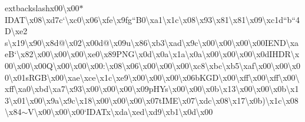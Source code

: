 extbackslash{}x00\textbackslash{}x00$\ast$\+I\+D\+A\+T\textbackslash{}x08\textbackslash{}xd7c`\textbackslash{}xc0\textbackslash{}x06\textbackslash{}xfe\textbackslash{}x9fg``\+B0\textbackslash{}xa1\textbackslash{}x1c\textbackslash{}x08\textbackslash{}x93\textbackslash{}x81\textbackslash{}x81\textbackslash{}x09\textbackslash{}xc1d``b``4\+D\textbackslash{}xe2 s\textbackslash{}x19\textbackslash{}x90\textbackslash{}x8d@\textbackslash{}x02\textbackslash{}x00d@\textbackslash{}x09u\textbackslash{}x86\textbackslash{}xb3\textbackslash{}xad\textbackslash{}x9c\textbackslash{}x00\textbackslash{}x00\textbackslash{}x00\textbackslash{}x00\+I\+E\+N\+D\textbackslash{}xae\+B`\textbackslash{}x82\textbackslash{}x00\textbackslash{}x00\textbackslash{}x00\textbackslash{}xe0\textbackslash{}x89\+P\+N\+G\textbackslash{}x0d\textbackslash{}x0a\textbackslash{}x1a\textbackslash{}x0a\textbackslash{}x00\textbackslash{}x00\textbackslash{}x00\textbackslash{}x0d\+I\+H\+D\+R\textbackslash{}x00\textbackslash{}x00\textbackslash{}x00\+Q\textbackslash{}x00\textbackslash{}x00\textbackslash{}x00\+:\textbackslash{}x08\textbackslash{}x06\textbackslash{}x00\textbackslash{}x00\textbackslash{}x00\textbackslash{}xc8\textbackslash{}xbc\textbackslash{}xb5\textbackslash{}xaf\textbackslash{}x00\textbackslash{}x00\textbackslash{}x00\textbackslash{}x01s\+R\+G\+B\textbackslash{}x00\textbackslash{}xae\textbackslash{}xce\textbackslash{}x1c\textbackslash{}xe9\textbackslash{}x00\textbackslash{}x00\textbackslash{}x00\textbackslash{}x06b\+K\+G\+D\textbackslash{}x00\textbackslash{}xff\textbackslash{}x00\textbackslash{}xff\textbackslash{}x00\textbackslash{}xff\textbackslash{}xa0\textbackslash{}xbd\textbackslash{}xa7\textbackslash{}x93\textbackslash{}x00\textbackslash{}x00\textbackslash{}x00\textbackslash{}x09p\+H\+Ys\textbackslash{}x00\textbackslash{}x00\textbackslash{}x0b\textbackslash{}x13\textbackslash{}x00\textbackslash{}x00\textbackslash{}x0b\textbackslash{}x13\textbackslash{}x01\textbackslash{}x00\textbackslash{}x9a\textbackslash{}x9c\textbackslash{}x18\textbackslash{}x00\textbackslash{}x00\textbackslash{}x00\textbackslash{}x07t\+I\+M\+E\textbackslash{}x07\textbackslash{}xdc\textbackslash{}x08\textbackslash{}x17\textbackslash{}x0b)\textbackslash{}x1c\textbackslash{}x08\textbackslash{}x84$\sim$\+V\textbackslash{}x00\textbackslash{}x00\textbackslash{}x00`\+I\+D\+A\+Tx\textbackslash{}xda\textbackslash{}xed\textbackslash{}xd9\textbackslash{}xb1\textbackslash{}x0d\textbackslash{}x00 